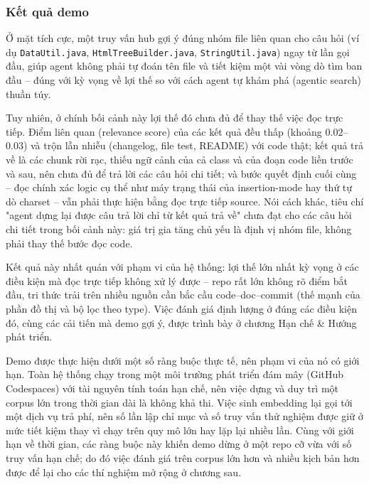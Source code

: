 \subsubsection{Kết quả demo}

Ở mặt tích cực, một truy vấn hub gợi ý đúng nhóm file liên quan cho câu hỏi (ví dụ \texttt{DataUtil.java}, \texttt{HtmlTreeBuilder.java}, \texttt{StringUtil.java}) ngay từ lần gọi đầu, giúp agent không phải tự đoán tên file và tiết kiệm một vài vòng dò tìm ban đầu -- đúng với kỳ vọng về lợi thế so với cách agent tự khám phá (agentic search) thuần túy.

Tuy nhiên, ở chính bối cảnh này lợi thế đó chưa đủ để thay thế việc đọc trực tiếp. Điểm liên quan (relevance score) của các kết quả đều thấp (khoảng $0.02$--$0.03$) và trộn lẫn nhiễu (changelog, file test, README) với code thật; kết quả trả về là các chunk rời rạc, thiếu ngữ cảnh của cả class và của đoạn code liền trước và sau, nên chưa đủ để trả lời các câu hỏi chi tiết; và bước quyết định cuối cùng -- đọc chính xác logic cụ thể như máy trạng thái của insertion-mode hay thứ tự dò charset -- vẫn phải thực hiện bằng đọc trực tiếp source. Nói cách khác, tiêu chí "agent dựng lại được câu trả lời chỉ từ kết quả trả về" chưa đạt cho các câu hỏi chi tiết trong bối cảnh này: giá trị gia tăng chủ yếu là định vị nhóm file, không phải thay thế bước đọc code.

Kết quả này nhất quán với phạm vi của hệ thống: lợi thế lớn nhất kỳ vọng ở các điều kiện mà đọc trực tiếp không xử lý được -- repo rất lớn không rõ điểm bắt đầu, tri thức trải trên nhiều nguồn cần bắc cầu code--doc--commit (thế mạnh của phần đồ thị và bộ lọc theo type). Việc đánh giá định lượng ở đúng các điều kiện đó, cùng các cải tiến mà demo gợi ý, được trình bày ở chương Hạn chế \& Hướng phát triển.

Demo được thực hiện dưới một số ràng buộc thực tế, nên phạm vi của nó có giới hạn. Toàn hệ thống chạy trong một môi trường phát triển đám mây (GitHub Codespaces) với tài nguyên tính toán hạn chế, nên việc dựng và duy trì một corpus lớn trong thời gian dài là không khả thi. Việc sinh embedding lại gọi tới một dịch vụ trả phí, nên số lần lập chỉ mục và số truy vấn thử nghiệm được giữ ở mức tiết kiệm thay vì chạy trên quy mô lớn hay lặp lại nhiều lần. Cùng với giới hạn về thời gian, các ràng buộc này khiến demo dừng ở một repo cỡ vừa với số truy vấn hạn chế; do đó việc đánh giá trên corpus lớn hơn và nhiều kịch bản hơn được để lại cho các thí nghiệm mở rộng ở chương sau.
